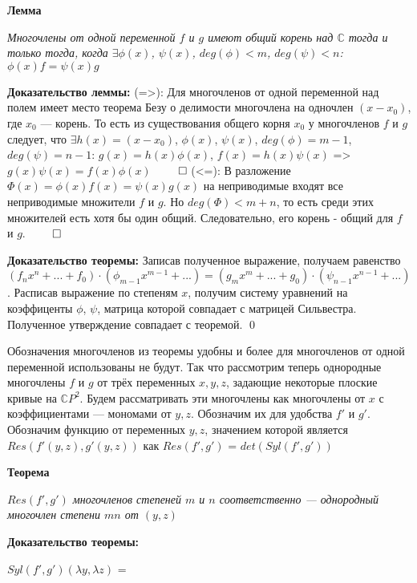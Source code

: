 \documentclass[a4paper, 12pt]{article}
\begin{document}
\textbf{Лемма}

\textit{ Многочлены от одной переменной $f$ и $g$ имеют общий корень над $\mathbb{C}$ тогда и только тогда, когда $\exists \phi(x)$, $\psi(x)$, $deg(\phi) < m$, $deg(\psi) < n$: $\phi(x)f = \psi(x)g$}

\smallskip
\textbf{Доказательство леммы:}
\smallskip
(=>): Для многочленов от одной переменной над полем имеет место теорема Безу о делимости многочлена на одночлен $(x - x_0)$, где $x_0$ --- корень. То есть из существования общего корня $x_0$ у многочленов $f$ и $g$ следует, что $\exists h(x)=(x-x_0)$, $\phi(x)$, $\psi(x)$, $deg(\phi) = m-1$, $deg(\psi) = n-1$: $g(x)=h(x)\phi(x)$, $f(x)=h(x)\psi(x)$ => $g(x)\psi(x) = f(x)\phi(x)$ $\qed$
\smallskip
(<=): В разложение $\Phi(x) = \phi(x)f(x) = \psi(x)g(x)$ на неприводимые входят все неприводимые множители $f$ и $g$. Но $deg(\Phi) < m + n$, то есть среди этих множителей есть хотя бы один общий. Следовательно, его корень - общий для $f$ и $g$. $\qed$

\textbf{Доказательство теоремы:}
\smallskip
Записав полученное выражение, получаем равенство $(f_nx^n + ... + f_0)\cdot(\phi_{m-1}x^{m-1} + ...) = (g_mx^m + ... + g_0)\cdot(\psi_{n-1}x^{n-1} + ...)$.\newline
Расписав выражение по степеням $x$, получим систему уравнений на коэффиценты $\phi$, $\psi$, матрица которой совпадает с матрицей Сильвестра.\newline
Полученное утверждение совпадает с теоремой. \qed
\bigskip

Обозначения многочленов из теоремы удобны и более для многочленов от одной переменной использованы не будут. Так что рассмотрим теперь однородные многочлены $f$ и $g$ от трёх переменных $x,y,z$, задающие некоторые плоские кривые на $\mathbb{C}P^2$.\newline
Будем рассматривать эти многочлены как многочлены от $x$ с коэффициентами --- мономами от $y,z$. Обозначим их для удобства $f'$ и $g'$.\newline
Обозначим функцию от переменных $y,z$, значением которой является\newline $Res(f'(y,z),g'(y,z))$ как $Res(f',g')$ = $det(Syl(f',g'))$

\smallskip
\textbf{Теорема}

\textit{$Res(f',g')$ многочленов степеней $m$ и $n$ соответственно --- однородный многочлен степени $mn$ от $(y,z)$}

\textbf{Доказательство теоремы:}

$Syl(f',g')(\lambda y,\lambda z)$ =
\end{document}
